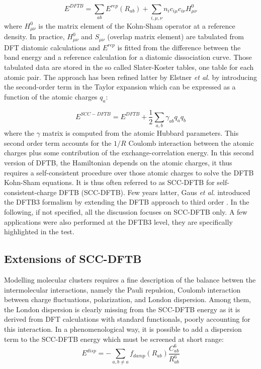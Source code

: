 \documentclass[]{interact}
\theoremstyle{plain}%
\theoremstyle{definition}
\theoremstyle{remark}
\begin{document}
\begin{equation}
E^{DFTB} = \sum_{ab} E^{rep}(R_{ab}) +\sum_{i,\mu,\nu}  n_i  c_{i\mu} c_{i\nu} H^0_{\mu\nu} 
\label{DFTB0}
\end{equation}
where $H^0_{\mu\nu}$ is the matrix element of the  Kohn-Sham operator at a reference density. In practice, $H^0_{\mu\nu}$
and $S_{\mu\nu}$ (overlap matrix element) are tabulated from DFT diatomic calculations and $E^{rep}$ is fitted  from the
difference between the band energy and a reference calculation for a diatomic dissociation curve. Those tabulated data are stored
in the so called Slater-Koster tables, one table for each atomic pair. The approach has been refined latter by Elstner {\it et al. }
\cite{elstner98} by introducing the second-order term in the Taylor expansion which can be expressed as a function of the atomic charges $q_a$:

\begin{equation}
E^{SCC-DFTB} =E^{DFTB} + \frac{1}{2} \sum_{a,b} \gamma_{ab} q_a q_b 
\label{sccdftb}
\end{equation}
where the $\gamma$ matrix is computed from the atomic Hubbard parameters. This second order term accounts for the $1/R$ Coulomb
interaction between the atomic charges plus some contribution of the exchange-correlation energy. In this second version of DFTB, the
Hamiltonian depends on the atomic charges, it thus requires a self-consistent procedure over those atomic charges to solve the 
DFTB Kohn-Sham equations. It is thus
often referred to as SCC-DFTB for self-consistent-charge DFTB (SCC-DFTB). Few years latter, Gaus \textit{et al.} introduced the DFTB3 formalism by
extending the DFTB approach to third order \cite{Gaus2011}. In the following, if not specified, all the discussion focuses on SCC-DFTB only. A few
applications were also performed at the DFTB3 level, they are specifically highlighted in the test.

\subsection{Extensions of SCC-DFTB}

Modelling molecular clusters requires a fine description of the balance betwen the intermolecular interactions, namely the Pauli repulsion, Coulomb interaction between charge fluctuations, polarization, and London dispersion. Among them, the London dispersion is clearly missing from the SCC-DFTB energy as it is derived from DFT calculations with standard functionals, poorly accounting for this interaction. In a phenomenological way, it is possible to add a dispersion term to the SCC-DFTB energy \cite{elstner01,dispdftb,DFTB_CM3}
 which must be screened at short range:
\begin{equation}
E^{disp}=-\sum_{a,b \neq a} f_{damp}(R_{ab})\frac{C^6_{ab}}{R_{ab}^6}
\label{edisp}
\end{equation}
\end{document}
